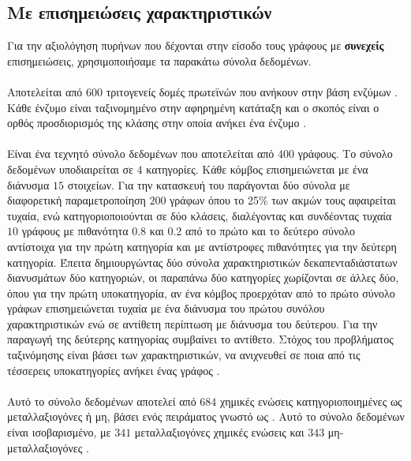 \subsection{Με επισημειώσεις χαρακτηριστικών}
\label{ssec:atr}
Για την αξιολόγηση πυρήνων που δέχονται στην είσοδο τους γράφους με \textbf{συνεχείς} επισημειώσεις, χρησιμοποιήσαμε τα παρακάτω σύνολα δεδομένων.

\paragraph*{} Αποτελείται από $600$ τριτογενείς δομές πρωτεϊνών που ανήκουν στην βάση ενζύμων .
Κάθε ένζυμο είναι ταξινομημένο στην αφηρημένη κατάταξη  και ο σκοπός είναι ο ορθός προσδιορισμός της κλάσης στην οποία ανήκει ένα ένζυμο \cite{Borgwardt2005}.

\paragraph*{} Είναι ένα τεχνητό σύνολο δεδομένων που αποτελείται από $400$ γράφους.
Το σύνολο δεδομένων υποδιαιρείται σε $4$ κατηγορίες.
Κάθε κόμβος επισημειώνεται με ένα διάνυσμα $15$ στοιχείων.
Για την κατασκευή του παράγονται δύο σύνολα με διαφορετική παραμετροποίηση $200$ γράφων  όπου το 25\% των ακμών τους αφαιρείται τυχαία, ενώ κατηγοριοποιούνται σε δύο κλάσεις, διαλέγοντας και συνδέοντας τυχαία $10$ γράφους με πιθανότητα 0.8 και 0.2 από το πρώτο και το δεύτερο σύνολο αντίστοιχα για την πρώτη κατηγορία και με αντίστροφες πιθανότητες για την δεύτερη κατηγορία.
Έπειτα δημιουργώντας δύο σύνολα χαρακτηριστικών δεκαπενταδιάστατων διανυσμάτων δύο κατηγοριών, οι παραπάνω δύο κατηγορίες χωρίζονται σε άλλες δύο, όπου για την πρώτη υποκατηγορία, αν ένα κόμβος προερχόταν από το πρώτο σύνολο γράφων επισημειώνεται τυχαία με ένα διάνυσμα του πρώτου συνόλου χαρακτηριστικών ενώ σε αντίθετη περίπτωση με διάνυσμα του δεύτερου.
Για την παραγωγή της δεύτερης κατηγορίας συμβαίνει το αντίθετο.
Στόχος του προβλήματος ταξινόμησης είναι βάσει των χαρακτηριστικών, να ανιχνευθεί σε ποια από τις τέσσερεις υποκατηγορίες ανήκει ένας γράφος \cite{Morris16}.

\paragraph*{} Αυτό το σύνολο δεδομένων αποτελεί από $684$ χημικές ενώσεις κατηγοριοποιημένες ως μεταλλαξιογόνες ή μη, βάσει ενός πειράματος γνωστό ως .
Αυτό το σύνολο δεδομένων είναι ισοβαρισμένο, με $341$ μεταλλαξιογόνες χημικές ενώσεις και $343$ μη-μεταλλαξιογόνες \cite{mahe2009graph, Neumann2016}.

